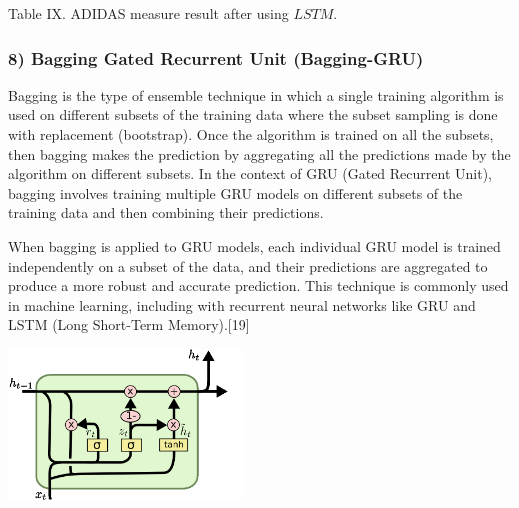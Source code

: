 \documentclass[conference]{IEEEtran}
\begin{document}
{Table IX. ADIDAS measure result after using $LSTM$.
\newline
\subsubsection*{\textbf{8) Bagging Gated Recurrent Unit (Bagging-GRU)}}
Bagging is the type of ensemble technique in which a single training algorithm is used on different subsets of the training data where the subset sampling is done with replacement (bootstrap). Once the algorithm is trained on all the subsets, then bagging makes the prediction by aggregating all the predictions made by the algorithm on different subsets. In the context of GRU (Gated Recurrent Unit), bagging involves training multiple GRU models on different subsets of the training data and then combining their predictions.

When bagging is applied to GRU models, each individual GRU model is trained independently on a subset of the data, and their predictions are aggregated to produce a more robust and accurate prediction. This technique is commonly used in machine learning, including with recurrent neural networks like GRU and LSTM (Long Short-Term Memory).[19]

\begin{center}
\includegraphics[max width=\linewidth, height = 4cm]{Gated-Recurrent-Unit-GRU.png}
\end{center}

}
\end{document}
